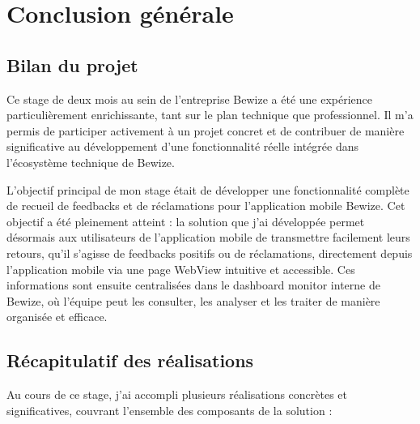 \chapter{Conclusion générale}

\section{Bilan du projet}
Ce stage de deux mois au sein de l'entreprise Bewize a été une expérience 
particulièrement enrichissante, tant sur le plan technique que professionnel. 
Il m'a permis de participer activement à un projet concret et de contribuer 
de manière significative au développement d'une fonctionnalité réelle 
intégrée dans l'écosystème technique de Bewize.

L'objectif principal de mon stage était de développer une fonctionnalité 
complète de recueil de feedbacks et de réclamations pour l'application 
mobile Bewize. Cet objectif a été pleinement atteint : la solution que 
j'ai développée permet désormais aux utilisateurs de l'application mobile 
de transmettre facilement leurs retours, qu'il s'agisse de feedbacks 
positifs ou de réclamations, directement depuis l'application mobile 
via une page WebView intuitive et accessible. Ces informations sont 
ensuite centralisées dans le dashboard monitor interne de Bewize, où 
l'équipe peut les consulter, les analyser et les traiter de manière 
organisée et efficace.

\section{Récapitulatif des réalisations}
Au cours de ce stage, j'ai accompli plusieurs réalisations concrètes 
et significatives, couvrant l'ensemble des composants de la solution :

